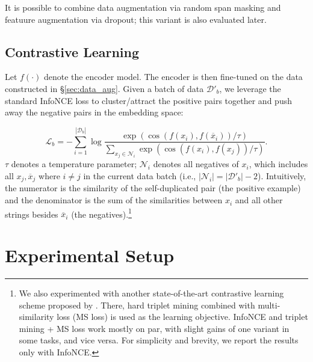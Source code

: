 \documentclass[11pt]{article}
\begin{document}
It is possible to combine data augmentation via random span masking and featuure augmentation via dropout; this variant is also evaluated later. 



\subsection{Contrastive Learning}\label{sec:loss}
Let $f(\cdot)$ denote the encoder model. The encoder is then fine-tuned on the data constructed in \S\ref{sec:data_aug}. Given a batch of data $\mathcal{D'}_b$, we leverage the standard InfoNCE loss \citep{oord2018representation} to cluster/attract the positive pairs together and push away the negative pairs in the embedding space:

\vspace{-2mm}
{\footnotesize
\begin{equation}
    \mathcal{L}_b = -\sum_{i=1}^{|\mathcal{D}_b|}\log\frac{\exp(\cos(f(x_i), f(\overline{x}_i))/\tau)}{\displaystyle \sum_{x_j\in \mathcal{N}_i}\exp(\cos(f(x_i), f(x_j))/\tau)}.
    \label{eq:infonce}
\end{equation}}$\tau$ denotes a temperature parameter; $\mathcal{N}_i$ denotes all negatives of $x_i$, which includes all $x_j,\overline{x}_j$ where $i\neq j$ in the current data batch (i.e., $|\mathcal{N}_i| = |\mathcal{D'}_b| - 2$). Intuitively, the numerator is the similarity of the self-duplicated pair (the positive example) and the denominator is the sum of the similarities between $x_i$ and all other strings besides $\overline{x}_i$ (the negatives).\footnote{We also experimented with another state-of-the-art contrastive learning scheme proposed by \citet{liu2020self}. There, hard triplet mining combined with multi-similarity loss (MS loss) is used as the learning objective. InfoNCE and triplet mining + MS loss work mostly on par, with slight gains of one variant in some tasks, and vice versa. For simplicity and brevity, we report the results only with InfoNCE.}


\section{Experimental Setup}
\label{sec:exp}
\end{document}
